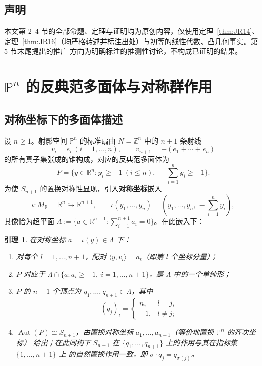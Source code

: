 \documentclass[11pt,a4paper]{article}
\newtheorem{lemma}[theorem]{引理}
\theoremstyle{definition}
\theoremstyle{remark}
\DeclareMathOperator{\Aut}{Aut}
\newcommand{\Z}{\mathbb{Z}}
\newcommand{\R}{\mathbb{R}}
\newcommand{\PP}{\mathbb{P}}
\begin{document}
\subsection{声明}

本文第 2--4 节的全部命题、定理与证明均为原创内容，仅使用定理~\ref{thm:JR14}、
定理~\ref{thm:JR16}（均严格转述并标注出处）与初等的线性代数、凸几何事实。第 5 节末尾提出的推广
方向为明确标注的推测性讨论，不构成已证明的结果。

\section{$\PP^n$ 的反典范多面体与对称群作用}

\subsection{对称坐标下的多面体描述}

设 $n \ge 1$。射影空间 $\PP^n$ 的标准扇由 $N = \Z^n$ 中的 $n+1$ 条射线
\[
  v_i = e_i\ (i = 1,\dots,n), \qquad v_{n+1} = -(e_1 + \cdots + e_n)
\]
的所有真子集张成的锥构成，对应的反典范多面体为
\[
  P = \{y \in \R^n : y_i \ge -1\ (i \le n),\ -\textstyle\sum_{i=1}^n y_i \ge -1\}.
\]
为使 $S_{n+1}$ 的置换对称性显现，引入\textbf{对称坐标}嵌入
\[
  \iota : M_\R = \R^n \hookrightarrow \R^{n+1}, \qquad
  \iota(y_1,\dots,y_n) = (y_1,\dots,y_n,\, -\textstyle\sum_{i=1}^n y_i),
\]
其像恰为超平面 $\Lambda := \{a \in \R^{n+1} : \sum_{i=1}^{n+1} a_i = 0\}$。在此嵌入下：

\begin{lemma}\label{lem:coords}
在对称坐标 $a = \iota(y) \in \Lambda$ 下：
\begin{enumerate}[label=(\roman*)]
  \item 对每个 $l = 1,\dots,n+1$，配对 $\langle y, v_l \rangle = a_l$（即第 $l$ 个坐标分量）；
  \item $P$ 对应于 $\Lambda \cap \{a : a_i \ge -1,\ i=1,\dots,n+1\}$，是 $\Lambda$ 中的一个单纯形；
  \item $P$ 的 $n+1$ 个顶点为 $q_1,\dots,q_{n+1} \in \Lambda$，其中
  \[
    (q_j)_l = \begin{cases} n, & l = j,\\ -1, & l \ne j; \end{cases}
  \]
  \item $\Aut(P) \cong S_{n+1}$，由置换对称坐标 $a_1,\dots,a_{n+1}$（等价地置换 $\PP^n$ 的齐次坐标）
  给出；在此同构下 $S_{n+1}$ 在 $\{q_1,\dots,q_{n+1}\}$ 上的作用与其在指标集 $\{1,\dots,n+1\}$ 上
  的自然置换作用一致，即 $\sigma \cdot q_j = q_{\sigma(j)}$。
\end{enumerate}
\end{lemma}
\end{document}
